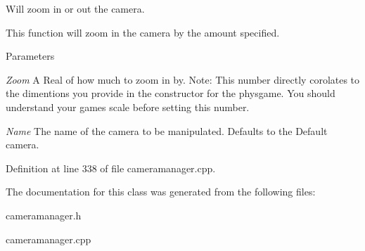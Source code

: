 Will zoom in or out the camera. 

This function will zoom in the camera by the amount specified. 
\begin{DoxyParams}{Parameters}
\item[{\em Zoom}]A Real of how much to zoom in by. Note: This number directly corolates to the dimentions you provide in the constructor for the physgame. You should understand your games scale before setting this number. \item[{\em Name}]The name of the camera to be manipulated. Defaults to the Default camera. \end{DoxyParams}


Definition at line 338 of file cameramanager.cpp.



The documentation for this class was generated from the following files:\begin{DoxyCompactItemize}
\item 
cameramanager.h\item 
cameramanager.cpp\end{DoxyCompactItemize}
